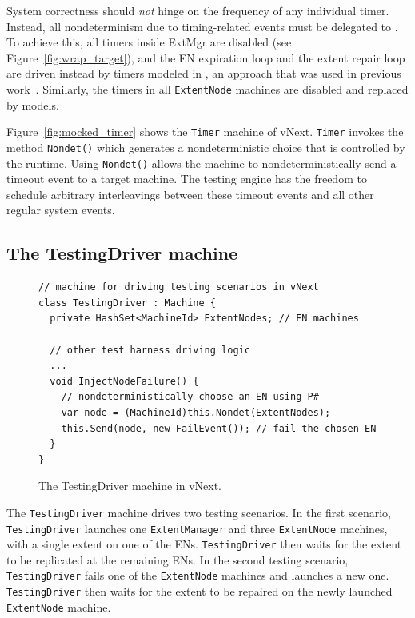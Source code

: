 System correctness should \emph{not} hinge on the frequency of any individual timer. Instead, all nondeterminism due to timing-related events must be delegated to \psharp. To achieve this, all timers inside ExtMgr are disabled (see Figure~\ref{fig:wrap_target}), and the EN expiration loop and the extent repair loop are driven instead by timers modeled in \psharp, an approach that was used in previous work~\cite{desai2015building}. Similarly, the timers in all \texttt{ExtentNode} machines are disabled and replaced by \psharp models.

Figure~\ref{fig:mocked_timer} shows the \texttt{Timer} machine of vNext. \texttt{Timer} invokes the \psharp method \texttt{Nondet()} which generates a nondeterministic choice that is controlled by the \psharp runtime. Using \texttt{Nondet()} allows the machine to nondeterministically send a timeout event to a target machine. The \psharp testing engine has the freedom to schedule arbitrary interleavings between these timeout events and all other regular system events.

\subsection{The TestingDriver machine}
\label{sec:method:driver}

\begin{figure}[t]
\begin{lstlisting}
// machine for driving testing scenarios in vNext
class TestingDriver : Machine {
  private HashSet<MachineId> ExtentNodes; // EN machines
  
  // other test harness driving logic
  ...
  void InjectNodeFailure() {
    // nondeterministically choose an EN using P#
    var node = (MachineId)this.Nondet(ExtentNodes);    
    this.Send(node, new FailEvent()); // fail the chosen EN
  }
}
\end{lstlisting}
\vspace{-4mm}
\caption{The TestingDriver machine in vNext.}
\label{fig:testing_driver}
\vspace{-2mm}
\end{figure}

The \texttt{TestingDriver} machine drives two testing scenarios. In the first scenario, \texttt{TestingDriver} launches one \texttt{ExtentManager} and three \texttt{ExtentNode} machines, with a single extent on one of the ENs. \texttt{TestingDriver} then waits for the extent to be replicated at the remaining ENs. In the second testing scenario, \texttt{TestingDriver} fails one of the \texttt{ExtentNode} machines and launches a new one. \texttt{TestingDriver} then waits for the extent to be repaired on the newly launched \texttt{ExtentNode} machine.

